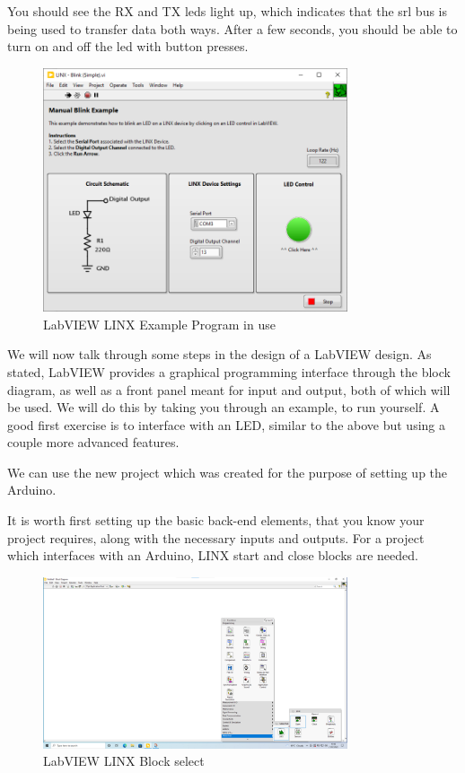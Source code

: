 \documentclass[a4paper,11pt]{report}
\begin{document}
You should see the RX and TX \gls{led}s light up, which indicates that the \gls{srl} bus is being used to transfer data both ways. After a few seconds, you should be able to turn on and off the \gls{led} with button presses.

\begin{figure}[H]
\centering
\includegraphics[width=0.8\textwidth]{screenshots/labviewarduino8}
\caption{LabVIEW LINX Example Program in use}
\end{figure}

We will now talk through some steps in the design of a LabVIEW design. As stated, LabVIEW provides a graphical programming interface through the block diagram, as well as a front panel meant for input and output, both of which will be used. We will do this by taking you through an example, to run yourself. A good first exercise is to interface with an LED, similar to the above but using a couple more advanced features.

We can use the new project which was created for the purpose of setting up the Arduino.

It is worth first setting up the basic back-end elements, that you know your project requires, along with the necessary inputs and outputs. For a project which interfaces with an Arduino, LINX start and close blocks are needed.

\begin{figure}[H]
\centering
\includegraphics[width=0.8\textwidth]{screenshots/labview6}
\caption{LabVIEW LINX Block select}
\end{figure}
\end{document}
